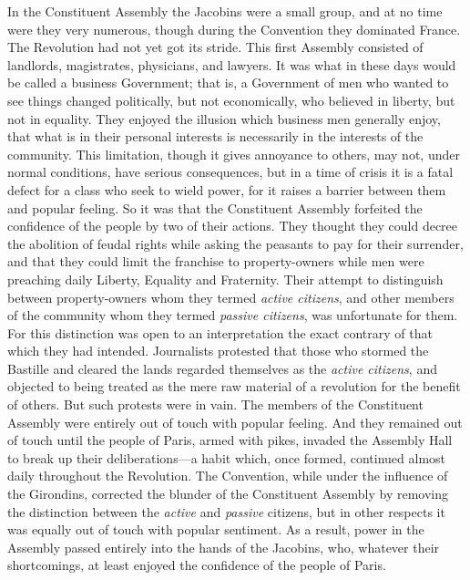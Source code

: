 \documentclass{book}
\begin{document}
In the Constituent Assembly the Jacobins were a small group, and at no time were they very numerous, though during the Convention they dominated France. The Revolution had not yet got its stride. This first Assembly consisted of landlords, magistrates, physicians, and lawyers. It was what in these days would be called a business Government; that is, a Government of men who wanted to see things changed politically, but not economically, who believed in liberty, but not in equality. They enjoyed the illusion which business men generally enjoy, that what is in their personal interests is necessarily in the interests of the community. This limitation, though it gives annoyance to others, may not, under normal conditions, have serious consequences, but in a time of crisis it is a fatal defect for a class who seek to wield power, for it raises a barrier between them and popular feeling. So it was that the Constituent Assembly forfeited the confidence of the people by two of their actions. They thought they could decree the abolition of feudal rights while asking the peasants to pay for their surrender, and that they could limit the franchise to property-owners while men were preaching daily Liberty, Equality and Fraternity. Their attempt to distinguish between property-owners whom they termed \emph{active citizens}, and other members of the community whom they termed \emph{passive citizens}, was unfortunate for them. For this distinction was open to an interpretation the exact contrary of that which they had intended. Journalists protested that those who stormed the Bastille and cleared the lands regarded themselves as the \emph{active citizens}, and objected to being treated as the mere raw material of a revolution for the benefit of others. But such protests were in vain. The members of the Constituent Assembly were entirely out of touch with popular feeling. And they remained out of touch until the people of Paris, armed with pikes, invaded the Assembly Hall to break up their deliberations—a habit which, once formed, continued almost daily throughout the Revolution. The Convention, while under the influence of the Girondins, corrected the blunder of the Constituent Assembly by removing the distinction between the \emph{active} and \emph{passive} citizens, but in other respects it was equally out of touch with popular sentiment. As a result, power in the Assembly passed entirely into the hands of the Jacobins, who, whatever their shortcomings, at least enjoyed the confidence of the people of Paris.
\end{document}
